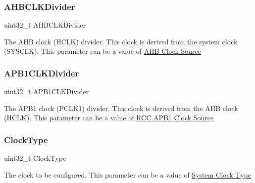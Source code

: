 \subsubsection{\texorpdfstring{A\+H\+B\+C\+L\+K\+Divider}{AHBCLKDivider}}
{\footnotesize\ttfamily uint32\+\_\+t A\+H\+B\+C\+L\+K\+Divider}

The A\+HB clock (H\+C\+LK) divider. This clock is derived from the system clock (S\+Y\+S\+C\+LK). This parameter can be a value of \hyperlink{group___r_c_c___a_h_b___clock___source}{A\+HB Clock Source} \mbox{\label{struct_r_c_c___clk_init_type_def_a994aca51c40decfc340e045da1a6ca19}} 
\subsubsection{\texorpdfstring{A\+P\+B1\+C\+L\+K\+Divider}{APB1CLKDivider}}
{\footnotesize\ttfamily uint32\+\_\+t A\+P\+B1\+C\+L\+K\+Divider}

The A\+P\+B1 clock (P\+C\+L\+K1) divider. This clock is derived from the A\+HB clock (H\+C\+LK). This parameter can be a value of \hyperlink{group___r_c_c___a_p_b1___clock___source}{R\+CC A\+P\+B1 Clock Source} \mbox{\label{struct_r_c_c___clk_init_type_def_afe92b105bff8e698233c286bb3018384}} 
\subsubsection{\texorpdfstring{Clock\+Type}{ClockType}}
{\footnotesize\ttfamily uint32\+\_\+t Clock\+Type}

The clock to be configured. This parameter can be a value of \hyperlink{group___r_c_c___system___clock___type}{System Clock Type} \mbox{\label{struct_r_c_c___clk_init_type_def_a02b70c23b593a55814d887f483ea0871}} 
